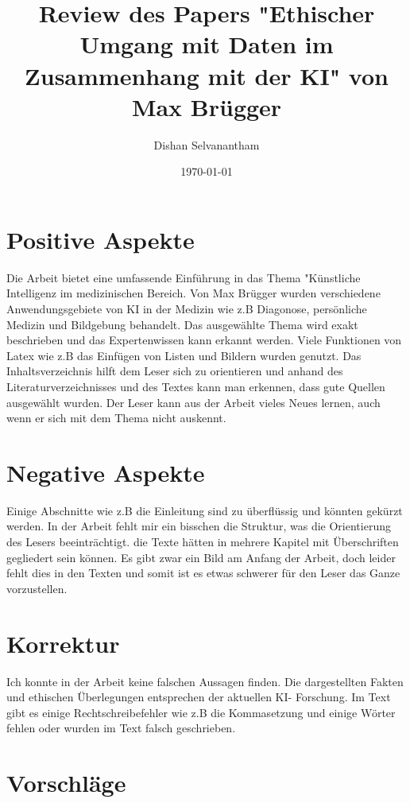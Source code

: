 \documentclass{article}
\title{Review des Papers "Ethischer Umgang mit Daten im Zusammenhang mit der KI" von Max Brügger}
\author{Dishan Selvanantham}
\date{\today}
\begin{document}
\maketitle


\section{Positive Aspekte}

Die Arbeit bietet eine umfassende Einführung in das Thema "Künstliche Intelligenz im medizinischen Bereich. Von Max Brügger wurden verschiedene Anwendungsgebiete von KI in der Medizin wie z.B Diagonose, persönliche Medizin und Bildgebung behandelt.
Das ausgewählte Thema wird exakt beschrieben und das Expertenwissen kann erkannt werden. Viele Funktionen von Latex wie z.B das Einfügen von Listen und Bildern wurden genutzt. Das Inhaltsverzeichnis hilft dem Leser sich zu orientieren und anhand des Literaturverzeichnisses und des Textes kann man erkennen, dass gute Quellen ausgewählt wurden. Der Leser kann aus der Arbeit vieles Neues lernen, auch wenn er sich mit dem Thema nicht auskennt.


\section{Negative Aspekte}


Einige Abschnitte wie z.B die Einleitung sind zu überflüssig und könnten gekürzt werden. In der Arbeit fehlt mir ein bisschen die Struktur, was die Orientierung des Lesers beeinträchtigt. die Texte hätten in mehrere Kapitel mit Überschriften gegliedert sein können.
Es gibt zwar ein Bild am Anfang der Arbeit, doch leider fehlt dies in den Texten und somit ist es etwas schwerer für den Leser das Ganze vorzustellen. 

\section{Korrektur}

Ich konnte in der Arbeit keine falschen Aussagen finden. Die dargestellten Fakten und ethischen Überlegungen entsprechen der aktuellen KI- Forschung.
Im Text gibt es einige Rechtschreibefehler wie z.B die Kommasetzung und einige Wörter fehlen oder wurden im Text falsch geschrieben.

\section{Vorschläge}


\printbibliography
\end{document}
